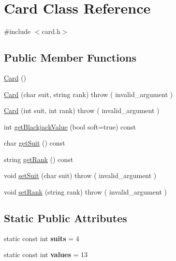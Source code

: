\hypertarget{classCard}{
\section{Card Class Reference}
\label{classCard}
}


{\ttfamily \#include $<$card.h$>$}\subsection*{Public Member Functions}
\begin{DoxyCompactItemize}
\item 
\hyperlink{classCard_a783f5854cbe8c183ee3d4414c01472c0}{Card} ()
\item 
\hyperlink{classCard_ae828e7f944693ad04df1e63bd5a30f19}{Card} (char suit, string rank)  throw ( invalid\_\-argument )
\item 
\hyperlink{classCard_aa7e418a2563e31981c09612d1aa37ad8}{Card} (int suit, int rank)  throw ( invalid\_\-argument )
\item 
int \hyperlink{classCard_a453adc4f12d3b0e632a7a13420c6058f}{getBlackjackValue} (bool soft=true) const 
\item 
char \hyperlink{classCard_a68cd406e737e3fa394793b32cf340dfc}{getSuit} () const 
\item 
string \hyperlink{classCard_a8de9d0cc458fd3fc041e634de1e3fe02}{getRank} () const 
\item 
void \hyperlink{classCard_a94e34530eb5ea054ade3d947ab1a700c}{setSuit} (char suit)  throw ( invalid\_\-argument )
\item 
void \hyperlink{classCard_aa5154e5b8eff5c531ec9e67eefe73576}{setRank} (string rank)  throw ( invalid\_\-argument )
\end{DoxyCompactItemize}
\subsection*{Static Public Attributes}
\begin{DoxyCompactItemize}
\item 
\hypertarget{classCard_a4de709df30ee7d187d371f262ff14f34}{
static const int {\bfseries suits} = 4}
\label{classCard_a4de709df30ee7d187d371f262ff14f34}

\item 
\hypertarget{classCard_a3cb54c9fbf37110a7a521f93f9fcd0bc}{
static const int {\bfseries values} = 13}
\label{classCard_a3cb54c9fbf37110a7a521f93f9fcd0bc}

\end{DoxyCompactItemize}
